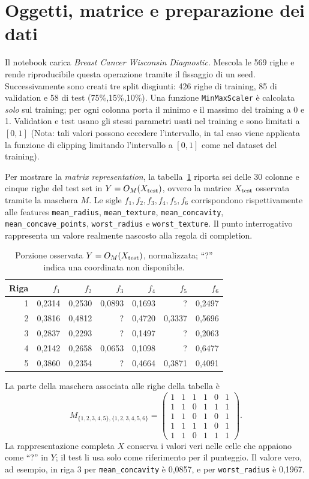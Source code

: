 \documentclass[10pt,a4paper]{article}
\newcommand{\feat}[1]{\texttt{#1}}
\begin{document}
\section{Oggetti, matrice e preparazione dei dati}
Il notebook carica \emph{Breast Cancer Wisconsin Diagnostic}. Mescola le 569 righe e rende riproducibile questa 
operazione tramite il fissaggio di un seed. Successivamente sono creati tre split disgiunti: 426 righe di training, 85 di validation e 
58 di test (75\%,15\%,10\%). Una funzione \feat{MinMaxScaler} è calcolata \emph{solo} sul training; per ogni colonna 
porta il minimo e il massimo del training a 0 e 1. Validation e test usano gli stessi parametri usati nel training e sono limitati a $[0,1]$ 
(Nota: tali valori possono eccedere l'intervallo, in tal caso viene applicata la funzione di clipping limitando l'intervallo a $[0,1]$ come 
nel dataset del training).

Per mostrare la \emph{matrix representation}, la tabella~\ref{tab:excerpt} riporta sei delle 30 colonne e cinque 
righe del test set in $Y=O_M(X_{\rm test})$, ovvero la matrice $X_{\rm test}$ osservata tramite la maschera $M$. 
Le sigle $f_1,f_2,f_3,f_4,f_5,f_6$ corrispondono rispettivamente alle features 
\feat{mean\_radius}, \feat{mean\_texture}, \feat{mean\_concavity}, 
\feat{mean\_concave\_points}, \feat{worst\_radius} e \feat{worst\_texture}. Il punto interrogativo 
rappresenta un valore realmente nascosto alla regola di completion.

\begin{table}[ht]
\centering\small
\caption{Porzione osservata $Y=O_M(X_{\rm test})$, normalizzata; ``?'' indica una coordinata non disponibile.}
\label{tab:excerpt}
\begin{tabular}{@{}r*{6}{r}@{}}
\toprule
Riga & $f_1$ & $f_2$ & $f_3$ & $f_4$ & $f_{5}$ & $f_{6}$ \\
\midrule
1 & 0,2314 & 0,2530 & 0,0893 & 0,1693 & ? & 0,2497 \\
2 & 0,3816 & 0,4812 & ? & 0,4720 & 0,3337 & 0,5696 \\
3 & 0,2837 & 0,2293 & ? & 0,1497 & ? & 0,2063 \\
4 & 0,2142 & 0,2658 & 0,0653 & 0,1098 & ? & 0,6477 \\
5 & 0,3860 & 0,2354 & ? & 0,4664 & 0,3871 & 0,4091 \\
\bottomrule
\end{tabular}
\end{table}

La parte della maschera associata alle righe della tabella è
\[
M_{\{1,2,3,4,5\},\{1,2,3,4,5,6\}}=
\begin{pmatrix}
1&1&1&1&0&1\\
1&1&0&1&1&1\\
1&1&0&1&0&1\\
1&1&1&1&0&1\\
1&1&0&1&1&1
\end{pmatrix}.
\]
La rappresentazione completa $X$ conserva i valori veri nelle celle che appaiono come ``?'' in $Y$; 
il test li usa solo come riferimento per il punteggio. Il valore vero, ad esempio, in riga 3 per 
\feat{mean\_concavity} è 0,0857, e per \feat{worst\_radius} è 0,1967.
\end{document}
